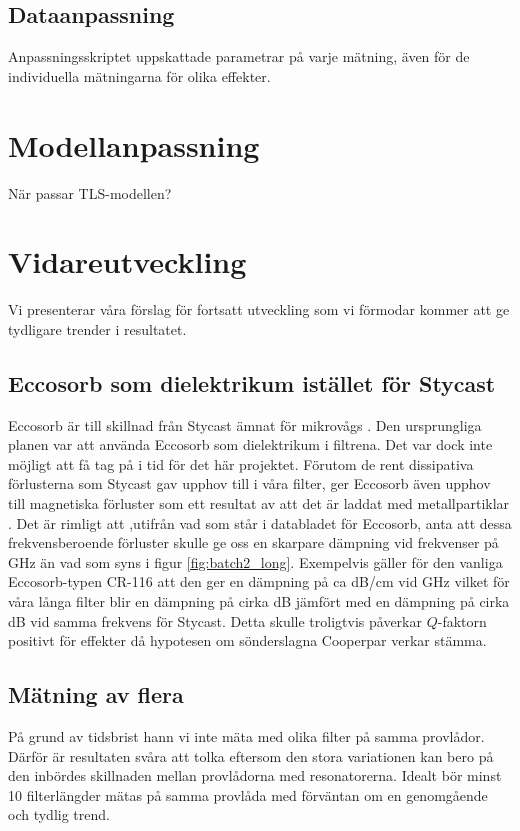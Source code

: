 \documentclass[main.tex]{subfiles}
\begin{document}
\subsection{Dataanpassning}
Anpassningsskriptet uppskattade parametrar på varje mätning, även för de individuella mätningarna för olika effekter. 
\section{Modellanpassning}
När passar TLS-modellen? 


\section{Vidareutveckling}
Vi presenterar våra förslag för fortsatt utveckling som vi förmodar kommer att ge tydligare trender i resultatet.

\subsection{Eccosorb som dielektrikum istället för Stycast}
Eccosorb är till skillnad från Stycast ämnat för mikrovågs . Den ursprungliga planen var att använda Eccosorb som dielektrikum i filtrena. Det var dock inte möjligt att få tag på i tid för det här projektet. Förutom de rent dissipativa förlusterna som Stycast gav upphov till i våra filter, ger Eccosorb även upphov till magnetiska förluster som ett resultat av att det är laddat med metallpartiklar \cite{Eccosorb}. Det är rimligt att ,utifrån vad som står i databladet för Eccosorb, anta att dessa frekvensberoende förluster skulle ge oss en skarpare dämpning vid frekvenser på \unit[8-50]{GHz} än vad som syns i figur \ref{fig:batch2_long}. Exempelvis gäller för den vanliga Eccosorb-typen CR-116 att den ger en dämpning på ca \unit[57]{dB/cm} vid \unit[18]{GHz} \cite{Eccosorb} vilket för våra långa filter blir en dämpning på cirka \unit[150]{dB} jämfört med en dämpning på cirka \unit[10]{dB} vid samma frekvens för Stycast. Detta skulle troligtvis påverkar $Q$-faktorn positivt för effekter då hypotesen om sönderslagna Cooperpar verkar stämma.

\subsection{Mätning av flera }
På grund av tidsbrist hann vi inte mäta med olika filter på samma provlådor. Därför är resultaten svåra att tolka eftersom den stora variationen kan bero på den inbördes skillnaden mellan provlådorna med resonatorerna. Idealt bör minst 10 filterlängder mätas på samma provlåda med förväntan om en genomgående och tydlig trend.
\end{document}
